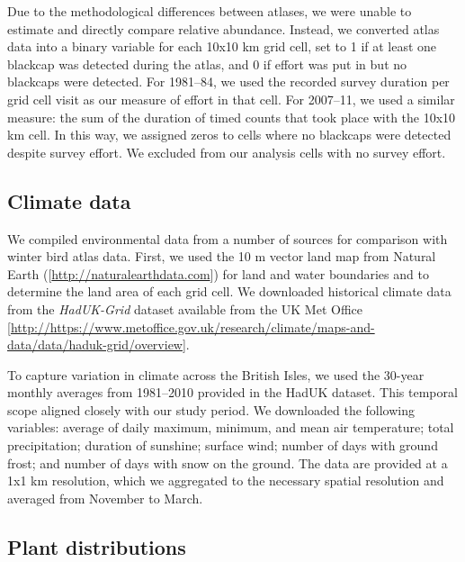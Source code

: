 \documentclass[a4paper, twoside]{templates/ociamthesis}
\begin{document}
Due to the methodological differences between atlases, we were unable to estimate and directly compare relative abundance. Instead, we converted atlas data into a binary variable for each 10x10 km grid cell, set to 1 if at least one blackcap was detected during the atlas, and 0 if effort was put in but no blackcaps were detected. For 1981--84, we used the recorded survey duration per grid cell visit as our measure of effort in that cell. For 2007--11, we used a similar measure: the sum of the duration of timed counts that took place with the 10x10 km cell. In this way, we assigned zeros to cells where no blackcaps were detected despite survey effort. We excluded from our analysis cells with no survey effort.

\hypertarget{climate-data}{%
\subsection{Climate data}\label{climate-data}}

We compiled environmental data from a number of sources for comparison with winter bird atlas data. First, we used the 10 m vector land map from Natural Earth ({[}\url{http://naturalearthdata.com}{]}) for land and water boundaries and to determine the land area of each grid cell. We downloaded historical climate data from the \emph{HadUK-Grid} dataset available from the UK Met Office {[}\url{http://https://www.metoffice.gov.uk/research/climate/maps-and-data/data/haduk-grid/overview}{]}.

To capture variation in climate across the British Isles, we used the 30-year monthly averages from 1981--2010 provided in the HadUK dataset. This temporal scope aligned closely with our study period. We downloaded the following variables: average of daily maximum, minimum, and mean air temperature; total precipitation; duration of sunshine; surface wind; number of days with ground frost; and number of days with snow on the ground. The data are provided at a 1x1 km resolution, which we aggregated to the necessary spatial resolution and averaged from November to March.

\hypertarget{plant-distributions}{%
\subsection{Plant distributions}\label{plant-distributions}}
\end{document}
